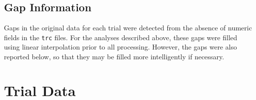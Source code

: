 \documentclass[
  a4paper,
  11pt,
  twoside,
  toc=flat,
  listof=flat
]{scrbook}
\begin{document}
\section{Gap Information}

Gaps in the original data for each trial were detected from the absence of numeric fields in the \texttt{trc} files.  For the analyses described above, these gaps were filled using linear interpolation prior to all processing.  However, the gaps were also reported below, so that they may be filled more intelligently if necessary.

\chapter{Trial Data}


\end{document}
